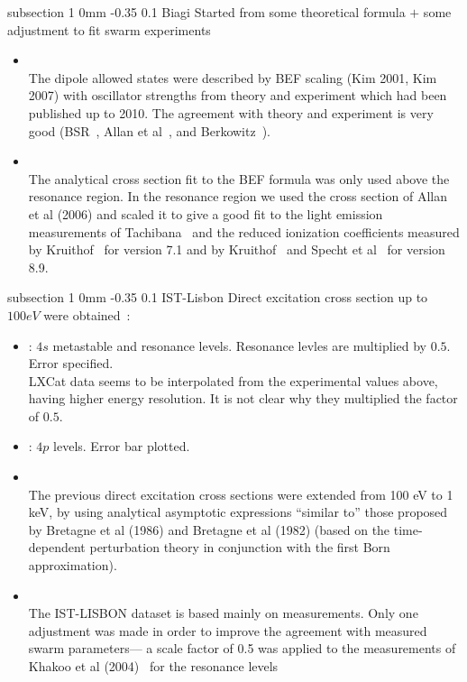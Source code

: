 \documentclass[11pt]{article}
\makeatletter
\renewcommand{\subsection}{\@startsection
{subsection}%
{1}%
{0mm}%
{-0.35\baselineskip}%
{0.1\baselineskip}%
{\normalfont\large\bfseries\color{myTan}}}%
\makeatother
\begin{document}
\subsection{Biagi}
Started from some theoretical formula $+$ some adjustment to fit swarm experiments
\begin{itemize}
\item \cite{Pitchford2013}\\
The dipole allowed states were described by BEF scaling (Kim 2001, Kim 2007) with oscillator strengths from theory and experiment which had been published up to 2010. The agreement with theory and experiment is very good (BSR~\cite{Zatsarinny2004}, Allan et al~\cite{Allan2006}, and Berkowitz~\cite{Berkowitz2002}).
\item \cite{Pitchford2013}\\
The analytical cross section fit to the BEF formula was only used above the resonance region. In the resonance region we used the cross section of Allan et al (2006) and scaled it to give a good fit to the light emission measurements of Tachibana~\cite{Tachibana1986} and the reduced ionization coefficients measured by Kruithof~\cite{Kruithof1940} for version 7.1 and by Kruithof~\cite{Kruithof1940} and Specht et al~\cite{Specht1980} for version 8.9.
\end{itemize}

\subsection{IST-Lisbon}
Direct excitation cross section up to $100eV$ were obtained~\cite{Alves2014}:
\begin{itemize}
\item \cite[Table 4]{Khakoo2003}: $4s$ metastable and resonance levels. Resonance levles are multiplied by $0.5$. Error specified.\\
LXCat data seems to be interpolated from the experimental values above, having higher energy resolution.
It is not clear why they multiplied the factor of $0.5$.
\item \cite[Figure 8]{Chilton1998}: $4p$ levels. Error bar plotted.
\item \cite{Pitchford2013}\\
The previous direct excitation cross sections were extended from 100 eV to 1 keV, by using analytical asymptotic expressions ``similar to'' those proposed by Bretagne et al (1986) and Bretagne et al (1982) (based on the time- dependent perturbation theory in conjunction with the first Born approximation).
\item \cite{Pitchford2013}\\
The IST-LISBON dataset is based mainly on measurements. Only one adjustment was made in order to improve the agreement with measured swarm parameters--- a scale factor of 0.5 was applied to the measurements of Khakoo et al (2004)~\cite{Khakoo2003} for the resonance levels
\end{itemize}
\end{document}
